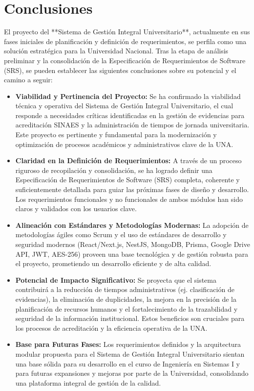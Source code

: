 \chapter{Conclusiones}

El proyecto del **Sistema de Gestión Integral Universitario**, actualmente en sus fases iniciales de planificación y definición de requerimientos, se perfila como una solución estratégica para la Universidad Nacional. Tras la etapa de análisis preliminar y la consolidación de la Especificación de Requerimientos de Software (SRS), se pueden establecer las siguientes conclusiones sobre su potencial y el camino a seguir:

\begin{itemize}
    \item \textbf{Viabilidad y Pertinencia del Proyecto:} Se ha confirmado la viabilidad técnica y operativa del Sistema de Gestión Integral Universitario, el cual responde a necesidades críticas identificadas en la gestión de evidencias para acreditación SINAES y la administración de tiempos de jornada universitaria. Este proyecto es pertinente y fundamental para la modernización y optimización de procesos académicos y administrativos clave de la UNA.

    \item \textbf{Claridad en la Definición de Requerimientos:} A través de un proceso riguroso de recopilación y consolidación, se ha logrado definir una Especificación de Requerimientos de Software (SRS) completa, coherente y suficientemente detallada para guiar las próximas fases de diseño y desarrollo. Los requerimientos funcionales y no funcionales de ambos módulos han sido claros y validados con los usuarios clave.

    \item \textbf{Alineación con Estándares y Metodologías Modernas:} La adopción de metodologías ágiles como Scrum y el uso de estándares de desarrollo y seguridad modernos (React/Next.js, NestJS, MongoDB, Prisma, Google Drive API, JWT, AES-256) proveen una base tecnológica y de gestión robusta para el proyecto, prometiendo un desarrollo eficiente y de alta calidad.

    \item \textbf{Potencial de Impacto Significativo:} Se proyecta que el sistema contribuirá a la reducción de tiempos administrativos (ej. clasificación de evidencias), la eliminación de duplicidades, la mejora en la precisión de la planificación de recursos humanos y el fortalecimiento de la trazabilidad y seguridad de la información institucional. Estos beneficios son cruciales para los procesos de acreditación y la eficiencia operativa de la UNA.

    \item \textbf{Base para Futuras Fases:} Los requerimientos definidos y la arquitectura modular propuesta para el Sistema de Gestión Integral Universitario sientan una base sólida para su desarrollo en el curso de Ingeniería en Sistemas I y para futuras expansiones y mejoras por parte de la Universidad, consolidando una plataforma integral de gestión de la calidad.
\end{itemize}

